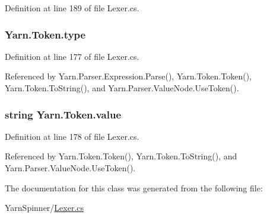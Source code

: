 Definition at line 189 of file Lexer.\-cs.

\hypertarget{a00167_a471a25da67fda0524f2375f9a882aafa}{
\subsubsection[{type}]{ Yarn.\-Token.\-type}}\label{a00167_a471a25da67fda0524f2375f9a882aafa}


Definition at line 177 of file Lexer.\-cs.



Referenced by Yarn.\-Parser.\-Expression.\-Parse(), Yarn.\-Token.\-Token(), Yarn.\-Token.\-To\-String(), and Yarn.\-Parser.\-Value\-Node.\-Use\-Token().

\hypertarget{a00167_a3df6b32d6190a639619a3f064c2154e2}{
\subsubsection[{value}]{\setlength{\rightskip}{0pt plus 5cm}string Yarn.\-Token.\-value}}\label{a00167_a3df6b32d6190a639619a3f064c2154e2}


Definition at line 178 of file Lexer.\-cs.



Referenced by Yarn.\-Token.\-Token(), Yarn.\-Token.\-To\-String(), and Yarn.\-Parser.\-Value\-Node.\-Use\-Token().



The documentation for this class was generated from the following file\-:\begin{DoxyCompactItemize}
\item 
Yarn\-Spinner/\hyperlink{a00298}{Lexer.\-cs}\end{DoxyCompactItemize}
